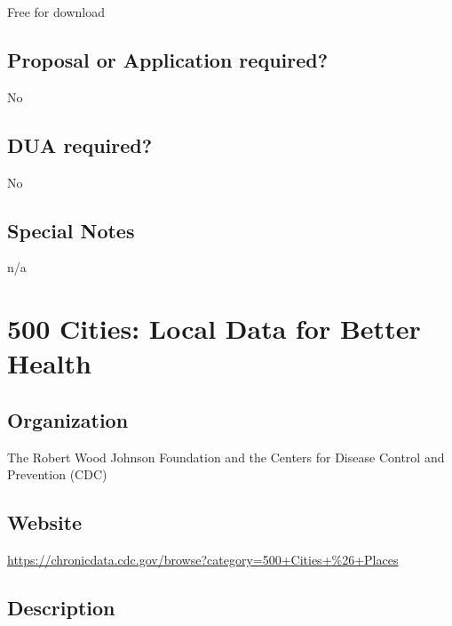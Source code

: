 \documentclass[
]{book}
\begin{document}
Free for download

\hypertarget{proposal-or-application-required-98}{%
\section{Proposal or Application required?}\label{proposal-or-application-required-98}}

No

\hypertarget{dua-required-98}{%
\section{DUA required?}\label{dua-required-98}}

No

\hypertarget{special-notes-98}{%
\section{Special Notes}\label{special-notes-98}}

n/a

\mainmatter

\hypertarget{cities-local-data-for-better-health}{%
\chapter{500 Cities: Local Data for Better Health}\label{cities-local-data-for-better-health}}

\hypertarget{organization-99}{%
\section{Organization}\label{organization-99}}

The Robert Wood Johnson Foundation and the Centers for Disease Control and Prevention (CDC)

\hypertarget{website-99}{%
\section{Website}\label{website-99}}

\url{https://chronicdata.cdc.gov/browse?category=500+Cities+\%26+Places}

\hypertarget{description-99}{%
\section{Description}\label{description-99}}
\end{document}
